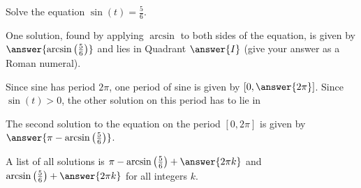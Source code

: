 \documentclass{ximera}
\author{Kenneth Berglund}
\begin{document}
\begin{exercise}
Solve the equation $\sin(t) = \frac{5}{6}$. 

One solution, found by applying $\arcsin$ to both sides of the equation, is given by $\answer{\arcsin\left(\frac{5}{6}\right)}$ and lies in Quadrant $\answer{I}$ (give your answer as a Roman numeral). 

\begin{exercise}
Since sine has period $2\pi$, one period of sine is given by $[0, \answer{2\pi}]$. Since $\sin(t) > 0$, the other solution on this period has to lie in 
\begin{multipleChoice}
\end{multipleChoice} 

\begin{exercise}
The second solution to the equation on the period $[0, 2\pi]$ is given by $\answer{\pi - \arcsin\left(\frac{5}{6}\right)}$. 

\begin{exercise}
A list of all solutions is $\pi - \arcsin\left(\frac{5}{6}\right) + \answer{2\pi k}$ and $\arcsin\left(\frac{5}{6}\right) + \answer{2\pi k}$ for all integers $k$. 
\end{exercise}
\end{exercise}
\end{exercise}
\end{exercise}
\end{document}
